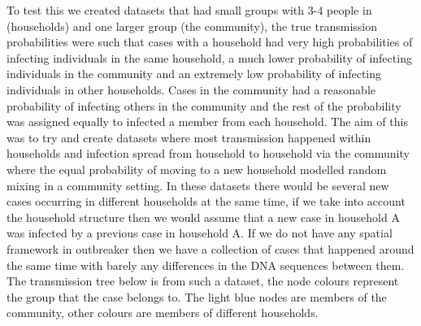 \documentclass[11pt,a4paper]{report}
\begin{document}
\begin{center}
\end{center}
To test this we created datasets that had small groups with 3-4 people in (households) and one larger group (the community), the true transmission probabilities were such that cases with a household had very high probabilities of infecting individuals in the same household, a much lower probability of infecting individuals in the community and an extremely low probability of infecting individuals in other households. Cases in the community had a reasonable probability of infecting others in the community and the rest of the probability was assigned equally to infected a member from each household. The aim of this was to try and create datasets where most transmission happened within households and infection spread from household to household via the community where the equal probability of moving to a new household modelled random mixing in a community setting. In these datasets there would be several new cases occurring in different households at the same time, if we take into account the household structure then we would assume that a new case in household A was infected by a previous case in household A. If we do not have any spatial framework in outbreaker then we have a collection of cases that happened around the same time with barely any differences in the DNA sequences between them. The transmission tree below is from such a dataset, the node colours represent the group that the case belongs to. The light blue nodes are members of the community, other colours are members of different households.
\end{document}
